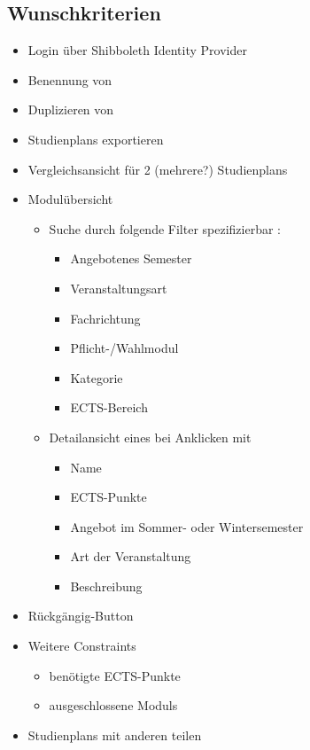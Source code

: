 \subsection{Wunschkriterien}
\label{subsec:project_goals-wunschkriterien}
\begin{itemize}[nosep]
	\item  Login über \gls{Shibboleth Identity Provider}	
	\item Benennung von 
	\item Duplizieren von 
	\item \glspl{Studienplan} exportieren
	\item Vergleichsansicht für 2 (mehrere?) \glspl{Studienplan}
	\item Modulübersicht
	\begin{itemize}[nosep]	
		\item Suche durch folgende Filter spezifizierbar : 
		\begin{itemize}[nosep]
			\item Angebotenes Semester
			\item Veranstaltungsart
			\item Fachrichtung
			\item Pflicht-/Wahlmodul
			\item Kategorie
			\item ECTS-Bereich
		\end{itemize}
		\item Detailansicht eines  bei Anklicken mit
		\begin{itemize}[nosep]
			\item Name
			\item \gls{ECTS-Punkte}
			\item Angebot im Sommer- oder Wintersemester
			\item Art der Veranstaltung	
			\item Beschreibung
		\end{itemize}
	\end{itemize}
	\item Rückgängig-Button
	\item Weitere \glspl{Constraint}
	\begin{itemize}[nosep]
		\item benötigte \gls{ECTS-Punkte}
		\item ausgeschlossene \glspl{Modul}
	\end{itemize}
	\item \glspl{Studienplan} mit anderen teilen
\end{itemize}
